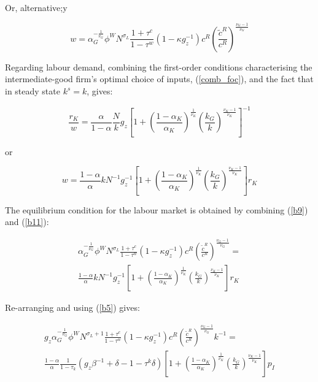 \documentclass[a4paper,11pt]{article}
\numberwithin{equation}{section}
\begin{document}
	Or, alternative;y
	
	\begin{equation} \label{b9}
	w=\alpha_G^{-\frac{1}{\nu_G}}\phi^W N^{\sigma_L}\frac{1+\tau^c}{1-\tau^w}\left(1-\kappa g_z^{-1}\right)c^R\left(\frac{\tilde{c}^R}{c^R}\right)^{\frac{\nu_G-1}{\nu_G}}
	\end{equation}
	
	Regarding labour demand, combining the first-order conditions characterising the intermediate-good firm's optimal choice of inputs, (\ref{comb_foc}), and the fact that in steady state $k^s=k$, gives:
	
	\begin{equation}
	\frac{r_K}{w}=\frac{\alpha}{1-\alpha}\frac{N}{k}g_z\left[1+\left(\frac{1-\alpha_K}{\alpha_K}\right)^{\frac{1}{\nu_K}}\left(\frac{k_G}{k}\right)^{\frac{\nu_K-1}{\nu_K}}\right]^{-1}
	\end{equation}
	
	or
	
	\begin{equation} \label{b11}
	w=\frac{1-\alpha}{\alpha}kN^{-1}g_z^{-1}\left[1+\left(\frac{1-\alpha_K}{\alpha_K}\right)^{\frac{1}{\nu_K}}\left(\frac{k_G}{k}\right)^{\frac{\nu_K-1}{\nu_K}}\right]r_K
	\end{equation}
	
	The equilibrium condition for the labour market is obtained by combining (\ref{b9}) and (\ref{b11}):
	
	\begin{multline}
	\alpha_G^{-\frac{1}{\nu_G}}\phi^W N^{\sigma_L}\frac{1+\tau^c}{1-\tau^w}\left(1-\kappa g_z^{-1}\right)c^R\left(\frac{\tilde{c}^R}{c^R}\right)^{\frac{\nu_G-1}{\nu_G}}=\\
	\frac{1-\alpha}{\alpha}kN^{-1}g_z^{-1}\left[1+\left(\frac{1-\alpha_K}{\alpha_K}\right)^{\frac{1}{\nu_K}}\left(\frac{k_G}{k}\right)^{\frac{\nu_K-1}{\nu_K}}\right]r_K
	\end{multline}
	
	Re-arranging and using (\ref{b5}) gives:
	
	\begin{multline}
	g_z\alpha_G^{-\frac{1}{\nu_G}}\phi^W N^{\sigma_L+1}\frac{1+\tau^c}{1-\tau^w}\left(1-\kappa g_z^{-1}\right)c^R\left(\frac{\tilde{c}^R}{c^R}\right)^{\frac{\nu_G-1}{\nu_G}}k^{-1}=\\
	\frac{1-\alpha}{\alpha}\frac{1}{1-\tau_k}\left(g_z\beta^{-1}+\delta-1-\tau^k\delta\right)\left[1+\left(\frac{1-\alpha_K}{\alpha_K}\right)^{\frac{1}{\nu_K}}\left(\frac{k_G}{k}\right)^{\frac{\nu_K-1}{\nu_K}}\right]p_I
	\end{multline}
	
\end{document}
